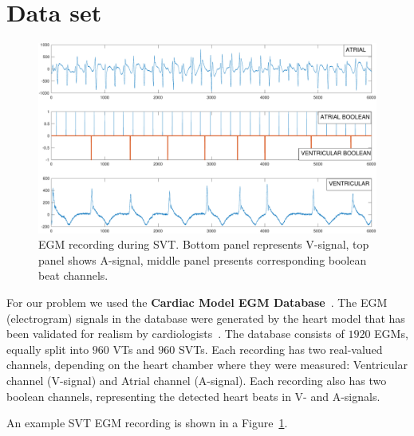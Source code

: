 \section{Data set}
\label{sec:data}

\begin{figure}[t]
	\centering
	\includegraphics[scale=0.3]{figures/atachs.pdf}
	\caption{EGM recording during SVT. Bottom panel represents 
	V-signal, top 
	panel shows A-signal, middle panel presents corresponding 
	boolean beat channels.}
	\label{fig:egm}
\end{figure}

For our problem we used the  
\textbf{Cardiac Model EGM Database}~\cite{jiang2016silico}. 
The EGM (electrogram) signals in the database were generated 
by the heart
model that has been validated for realism by 
cardiologists~\cite{jiang2016silico}.
	The database consists
	of $1920$ EGMs, equally split into $960$ VTs 
	and
	$960$ SVTs. Each recording has two real-valued channels, 
	depending on the 
	heart chamber where they were measured: Ventricular channel 
	(V-signal) and Atrial channel (A-signal). Each recording also has 
	two boolean channels, representing the detected heart beats in V- 
	and A-signals.
	
	An example SVT EGM recording is shown in a Figure~\ref{fig:egm}. 

